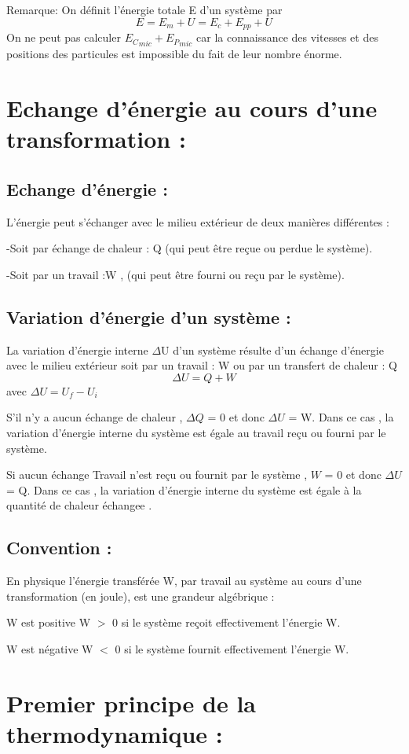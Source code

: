 \documentclass[12pt]{article}
\begin{document}
Remarque: On définit l’énergie totale E d’un système par
$$E = E_m + U  = E_c + E_{pp} + U$$
On ne peut pas calculer ${E_C}_{mic} + {E_P}_{mic}$ car la connaissance des vitesses et des
positions des particules est impossible du fait de leur nombre énorme.

\section{Echange d’énergie au cours d’une transformation :}
\subsection{Echange d’énergie :}
L’énergie peut s’échanger avec le milieu extérieur de deux manières différentes :

-Soit par échange de chaleur : Q (qui peut être reçue ou perdue le système).

-Soit par un travail :W , (qui peut être fourni ou reçu par le système).
\subsection{ Variation d’énergie d’un système :}
La variation d’énergie interne $\Delta$U d’un système résulte d’un échange d’énergie avec le milieu extérieur soit par un travail : W ou par un transfert de chaleur : Q
$$\Delta{U}=Q + W $$
avec $\Delta{U} =U_f - U_i$

S'il n'y a aucun échange de chaleur , $\Delta{Q}$ = 0 et donc $\Delta{U}$ = W. Dans ce cas , la variation d'énergie interne du système est égale au travail reçu ou fourni par le système.

Si aucun échange Travail n'est reçu ou fournit par le système , $W$ = 0 et donc $\Delta{U}$ = Q. Dans ce cas , la variation d'énergie interne du système est égale à la quantité de chaleur  échangee .

\subsection{Convention :}
En physique l’énergie transférée W, par travail au
système au cours d’une transformation (en joule),
est une grandeur algébrique :

W est positive W $>$ 0 si le système reçoit
effectivement l’énergie W.

W est  négative W $<$ 0 si le système fournit
effectivement l’énergie W.

\section{Premier principe de la thermodynamique : }
\end{document}
